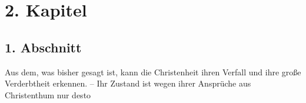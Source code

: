 
\chapter{2. Kapitel}


\section{1. Abschnitt}

Aus dem, was bisher gesagt ist, kann die Christenheit ihren Verfall und ihre große Verderbtheit erkennen. – Ihr Zustand ist wegen ihrer Ansprüche aus Christenthum nur desto

